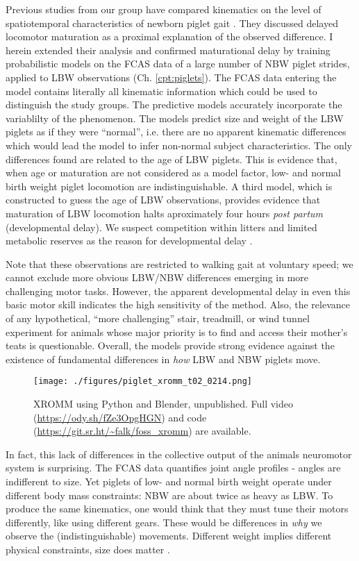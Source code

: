 Previous studies from our group have compared kinematics on the level of spatiotemporal characteristics of newborn piglet gait \citep{VandenHole2018}.
They discussed delayed locomotor maturation as a proximal explanation of the observed difference.
I herein extended their analysis and confirmed maturational delay by training probabilistic models on the FCAS data of a large number of NBW piglet strides, applied to LBW observations (Ch. \ref{cpt:piglets}).
The FCAS data entering the model contains literally all kinematic information which could be used to distinguish the study groups.
The predictive models accurately incorporate the variablilty of the phenomenon.
The models predict size and weight of the LBW piglets as if they were ``normal'', i.e. there are no apparent kinematic differences which would lead the model to infer non-normal subject characteristics.
The only differences found are related to the age of LBW piglets.
This is evidence that, when age or maturation are not considered as a model factor, low- and normal birth weight piglet locomotion are indistinguishable.
A third model, which is constructed to guess the age of LBW observations, provides evidence that maturation of LBW locomotion halts aproximately four hours \emph{post partum} (developmental delay).
We suspect competition within litters and limited metabolic reserves as the reason for developmental delay \citep{VandenHole2019}.

Note that these observations are restricted to walking gait at voluntary speed; we cannot exclude more obvious LBW/NBW differences emerging in more challenging motor tasks.
However, the apparent developmental delay in even this basic motor skill indicates the high sensitivity of the method.
Also, the relevance of any hypothetical, ``more challenging'' stair, treadmill, or wind tunnel experiment for animals whose major priority is to find and access their mother's teats is questionable.
Overall, the models provide strong evidence against the existence of fundamental differences in \emph{how} LBW and NBW piglets move.



\begin{figure}[p]
\centering
\texttt{[image: ./figures/piglet\_xromm\_t02\_0214.png]}
\caption{\label{fig:piglet_xromm}XROMM using Python and Blender, unpublished. Full video (\url{https://ody.sh/fZe3OpgHGN}) and code (\url{https://git.sr.ht/\~falk/foss\_xromm}) are available.}
\end{figure}

In fact, this lack of differences in the collective output of the animals neuromotor system is surprising.
The FCAS data quantifies joint angle profiles - angles are indifferent to size.
Yet piglets of low- and normal birth weight operate under different body mass constraints: NBW are about twice as heavy as LBW.
To produce the same kinematics, one would think that they must tune their motors differently, like using different gears.
These would be differences in \emph{why} we observe the (indistinguishable) movements.
Different weight implies different physical constraints, size does matter \citep{Aerts2023}.

